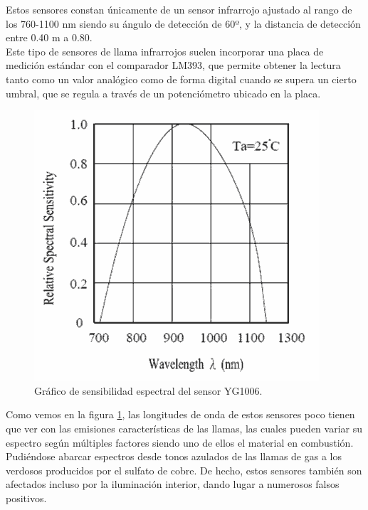 Estos sensores constan únicamente de un sensor infrarrojo ajustado al rango de los 760-1100 nm siendo su ángulo de detección de 60º, y la distancia de detección entre 0.40 m a 0.80.\\

Este tipo de sensores de llama infrarrojos suelen incorporar una placa de medición estándar con el comparador LM393, que permite obtener la lectura tanto como un valor analógico
como de forma digital cuando se supera un cierto umbral, que se regula a través de un potenciómetro ubicado en la placa.\\

 \begin{figure}[H]
  \begin{center}
    \includegraphics[scale=1.6]{imagenes/longitudes_onda.png}
  \end{center}
  \caption{Gráfico de sensibilidad espectral del sensor YG1006.}
  \label{figura:longitudes_onda}
\end{figure}

Como vemos en la figura \ref{figura:longitudes_onda}, las longitudes de onda de estos sensores poco tienen que ver con las emisiones características de las llamas, las cuales
pueden variar su espectro según múltiples factores siendo uno de ellos el material en combustión. Pudiéndose abarcar espectros desde tonos azulados de las llamas de gas a los
verdosos producidos por el sulfato de cobre. De hecho, estos sensores también son afectados incluso por la iluminación interior, dando lugar a numerosos falsos positivos.\\

